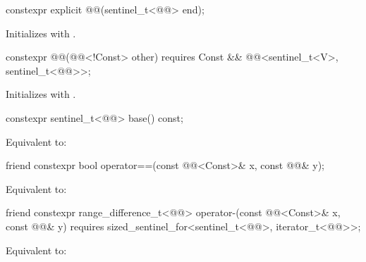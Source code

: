 %
\begin{itemdecl}
constexpr explicit @@(sentinel_t<@@> end);
\end{itemdecl}

\begin{itemdescr}
\pnum
\effects
Initializes  with .
\end{itemdescr}

%
\begin{itemdecl}
constexpr @@(@@<!Const> other)
  requires Const && @@<sentinel_t<V>, sentinel_t<@@>>;
\end{itemdecl}

\begin{itemdescr}
\pnum
\effects
Initializes  with .
\end{itemdescr}

%
\begin{itemdecl}
constexpr sentinel_t<@@> base() const;
\end{itemdecl}

\begin{itemdescr}
\pnum
\effects
Equivalent to: 
\end{itemdescr}

%
\begin{itemdecl}
friend constexpr bool operator==(const @@<Const>& x, const @@& y);
\end{itemdecl}

\begin{itemdescr}
\pnum
\effects
Equivalent to: 
\end{itemdescr}

%
\begin{itemdecl}
friend constexpr range_difference_t<@@>
  operator-(const @@<Const>& x, const @@& y)
    requires sized_sentinel_for<sentinel_t<@@>, iterator_t<@@>>;
\end{itemdecl}

\begin{itemdescr}
\pnum
\effects
Equivalent to: 
\end{itemdescr}

